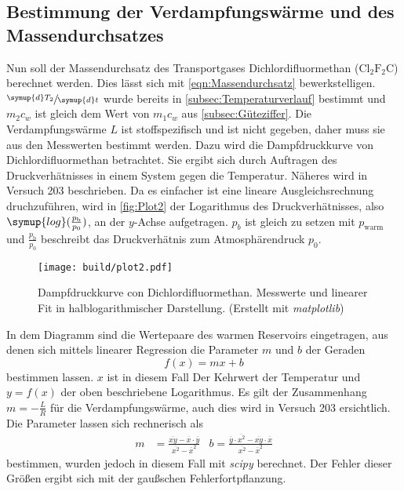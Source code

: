 \subsection{Bestimmung der Verdampfungswärme und des Massendurchsatzes}
\label{subsec:Massendurchsatz}
Nun soll der Massendurchsatz des Transportgases Dichlordifluormethan ($\text{Cl}_2\text{F}_2\text{C}$) berechnet werden. Dies lässt sich mit \autoref{eqn:Massendurchsatz} bewerkstelligen. 
$\sfrac{\symup{d}T_2}{\symup{d}t}$ wurde bereits in \autoref{subsec:Temperaturverlauf} bestimmt und $m_2 c_w$ ist gleich dem Wert von $m_1 c_w$ aus \autoref{subsec:Güteziffer}.
Die Verdampfungswärme $L$ ist stoffspezifisch und ist nicht gegeben, daher muss sie aus den Messwerten bestimmt werden. Dazu wird die Dampfdruckkurve von Dichlordifluormethan
betrachtet. Sie ergibt sich durch Auftragen des Druckverhätnisses in einem System gegen die Temperatur. Näheres wird in Versuch 203 \cite{v203} beschrieben. 
Da es einfacher ist eine lineare Ausgleichsrechnung druchzuführen, wird in \autoref{fig:Plot2} der Logarithmus des Druckverhätnisses, also
$\symup{log}(\frac{p_{\text{b}}}{p_0})$, an der $y$-Achse aufgetragen. $p_b$ ist gleich zu setzen mit $p_\text{warm}$ und $\frac{p_{\text{b}}}{p_0}$ beschreibt das Druckverhätnis
zum Atmosphärendruck $p_0$.

\begin{figure}
  \centering
  \label{fig:Plot2}
  \texttt{[image: build/plot2.pdf]}
  \caption{Dampfdruckkurve con Dichlordifluormethan. Messwerte und linearer Fit in halblogarithmischer Darstellung. (Erstellt mit \textit{matplotlib}\cite{matplotlib})}
\end{figure}

In dem Diagramm sind die Wertepaare des warmen Reservoirs eingetragen, aus denen sich mittels linearer Regression die Parameter $m$ und $b$ der Geraden
\begin{equation*}
  f(x) = mx + b
\end{equation*}
bestimmen lassen. $x$ ist in diesem Fall Der Kehrwert der Temperatur und $y = f(x)$ der oben beschriebene Logarithmus. Es gilt der Zusammenhang $m = - \frac{L}{R}$ für 
die Verdampfungswärme, auch dies wird in Versuch 203 \cite{v203} ersichtlich. Die Parameter lassen sich rechnerisch als
\begin{align*}
  m &= \frac{\overline{xy}-\overline{x} \cdot \overline{y}}{\overline{x^2}-\overline{x}^2} & %
  b = \frac{\overline{y} \cdot \overline{x^2}-\overline{xy} \cdot \overline{x}}{\overline{x^2}-\overline{x}^2}
\end{align*}
bestimmen, wurden jedoch in diesem Fall mit \textit{scipy} \cite{scipy} berechnet. Der Fehler dieser Größen ergibt sich mit der gaußschen Fehlerfortpflanzung.

